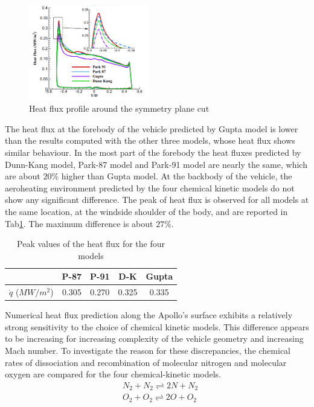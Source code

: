\documentclass[11pt,a4paper,twocolumn]{article}
\begin{document}
\begin{figure}
    \centering
    \includegraphics[width=0.47\textwidth]{myimages/comparison.png}
    \caption{Heat flux profile around the symmetry plane cut}
    \label{fig:comparison}
\end{figure}

The heat flux at the forebody of the vehicle predicted by Gupta model is lower than the results computed with the other three models, whose heat flux shows similar behaviour. In the most part of the forebody the heat fluxes predicted by Dunn-Kang model, Park-87 model and Park-91 model are nearly the same, which are about $20\%$ higher than Gupta model. At the backbody of the vehicle, the aeroheating environment predicted by the four chemical kinetic models do not show any significant difference. The peak of heat flux is observed for all models at the same location, at the windside shoulder of the body, and are reported in Tab\ref{tab:heatflux}. The maximum difference is about $27\%$. 

\begin{table}[h]
    \centering
    \begin{tabular}{|c|c|c|c|c|}
    \hline
    \hline
                            & P-87 & P-91 & D-K & Gupta \\
                            \hline
     $\dot q$ ($MW/m^2$)    & 0.305 &  0.270  & 0.325 & 0.335  \\
     \hline
     \hline
    \end{tabular}
    \caption{Peak values of the heat flux for the four models}
    \label{tab:heatflux}
\end{table}

Numerical heat flux prediction along the Apollo’s surface exhibits a relatively strong sensitivity to the choice of chemical kinetic models. This difference appears to be increasing for increasing complexity of the vehicle geometry and increasing Mach number\cite{wang2017assessment}. To investigate the reason for these discrepancies, the chemical rates of dissociation and recombination of molecular nitrogen and molecular oxygen are compared for the four chemical-kinetic models.
\begin{align*}
        & N_2+N_2\rightleftharpoons 2N+N_2\\
        & O_2+O_2\rightleftharpoons 2O+O_2
\end{align*}
\end{document}
